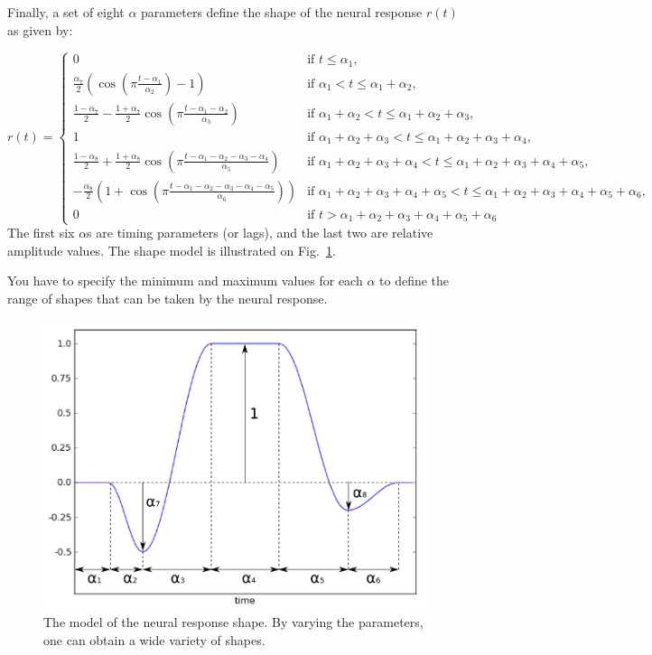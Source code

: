 Finally, a set of eight $\alpha$ parameters define the shape of the neural response $r(t)$ as given by:

\begin{equation*}
 r(t) = \left\{\begin{array}{ll}
0 & \text{if } t \leq \alpha_1,\\
\frac{\alpha_7}{2} ( \cos(\pi \frac{t-\alpha_1}{\alpha_2}) -1 ) & \text{if } \alpha_1 < t \leq \alpha_1 + \alpha_2,\\
\frac{1 - \alpha_7}{2} - \frac{1 + \alpha_7}{2} \cos(\pi \frac{t-\alpha_1 - \alpha_2}{\alpha_3}) & \text{if } \alpha_1 + \alpha_2 < t \leq \alpha_1 + \alpha_2 + \alpha_3,\\
1 & \text{if } \alpha_1 + \alpha_2  + \alpha_3< t \leq \alpha_1 + \alpha_2 + \alpha_3 + \alpha_4,\\
\frac{1 - \alpha_8}{2} + \frac{1 + \alpha_8}{2} \cos(\pi \frac{t-\alpha_1 - \alpha_2 - \alpha_3 - \alpha_4}{\alpha_5}) & \text{if } \alpha_1 + \alpha_2 + \alpha_3 + \alpha_4< t \leq \alpha_1 + \alpha_2 + \alpha_3 + \alpha_4 + \alpha_5,\\
- \frac{\alpha_8}{2} ( 1 + \cos(\pi \frac{t-\alpha_1 - \alpha_2 - \alpha_3 - \alpha_4 - \alpha_5}{\alpha_6})) & \text{if } \alpha_1 + \alpha_2 + \alpha_3 + \alpha_4 + \alpha_5 < t \leq \alpha_1 + \alpha_2 + \alpha_3 + \alpha_4 + \alpha_5 + \alpha_6,\\
0 & \text{if } t > \alpha_1 + \alpha_2 + \alpha_3 + \alpha_4 + \alpha_5 + \alpha_6
\end{array}\right.
\end{equation*}
The first six $\alpha$s are timing parameters (or lags), and the last two are relative amplitude values. The shape model is illustrated on Fig.~\ref{fig:shape}.

You have to specify the minimum and maximum values for each $\alpha$ to define the range of shapes that can be taken by the neural response.

\begin{figure}[!h]
\begin{center}
\includegraphics[width=12cm]{figs/response_shape.png}
\caption{The model of the neural response shape. By varying the parameters, one can obtain a wide variety of shapes.}
\label{fig:shape}
\end{center}
\end{figure}
